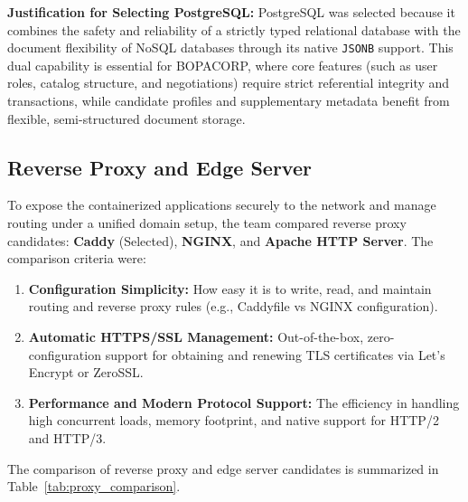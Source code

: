 \documentclass[letterpaper%
, oneside%
, 12pt%
, memoireprojet%
, english%
,creativecommons,hyperref, withAlgo2e %
]{thETS}
\begin{document}
\textbf{Justification for Selecting PostgreSQL:} PostgreSQL was selected because it combines the safety and reliability of a strictly typed relational database with the document flexibility of NoSQL databases through its native \texttt{JSONB} support. This dual capability is essential for BOPACORP, where core features (such as user roles, catalog structure, and negotiations) require strict referential integrity and transactions, while candidate profiles and supplementary metadata benefit from flexible, semi-structured document storage.
\subsection{Reverse Proxy and Edge Server}
To expose the containerized applications securely to the network and manage routing under a unified domain setup, the team compared reverse proxy candidates: \textbf{Caddy} (Selected), \textbf{NGINX}, and \textbf{Apache HTTP Server}. The comparison criteria were:
\begin{enumerate}
    \item \textbf{Configuration Simplicity:} How easy it is to write, read, and maintain routing and reverse proxy rules (e.g., Caddyfile vs NGINX configuration).
    \item \textbf{Automatic HTTPS/SSL Management:} Out-of-the-box, zero-configuration support for obtaining and renewing TLS certificates via Let's Encrypt or ZeroSSL.
    \item \textbf{Performance and Modern Protocol Support:} The efficiency in handling high concurrent loads, memory footprint, and native support for HTTP/2 and HTTP/3.
\end{enumerate}

The comparison of reverse proxy and edge server candidates is summarized in Table~\ref{tab:proxy_comparison}.
\end{document}
